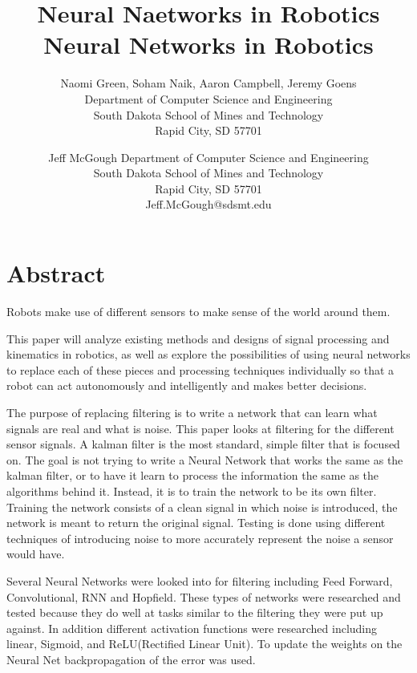 \documentclass[12pt]{article}
\begin{document}
\pagestyle{plain}

\title{Neural Naetworks in Robotics}

\author{
Naomi Green, Soham Naik, Aaron Campbell, Jeremy Goens\\
Department of Computer Science and Engineering\\
South Dakota School of Mines and Technology\\
Rapid City, SD 57701\\
\and
Jeff McGough
Department of Computer Science and Engineering\\
South Dakota School of Mines and Technology\\
Rapid City, SD 57701\\
Jeff.McGough@sdsmt.edu
}

\title{ Neural Networks in Robotics}
\maketitle
\thispagestyle{empty}

\section*{\centering Abstract}
Robots make use of different sensors to make sense of the world around them. 

This paper will analyze existing methods and designs of signal processing and kinematics in robotics, as well as explore the possibilities of using neural networks to replace each of these pieces and processing techniques individually so that a robot can act autonomously and intelligently and makes better decisions. 

The purpose of replacing filtering is to write a network that can learn what signals are real and what is noise. This paper looks at filtering for the different sensor signals. A kalman filter is the most standard, simple filter that is focused on. The goal is not trying to write a Neural Network that works the same as the kalman filter, or to have it learn to process the information the same as the algorithms behind it. Instead, it is to train the network to be its own filter. Training the network consists of a clean signal in which noise is introduced, the network is meant to return the original signal. Testing is done using different techniques of introducing noise to more accurately represent the noise a sensor would have.

Several Neural Networks were looked into for filtering including Feed Forward, Convolutional, RNN and Hopfield. These types of networks were researched and tested because they do well at tasks similar to the filtering they were put up against. In addition different activation functions were researched including linear, Sigmoid, and ReLU(Rectified Linear Unit). To update the weights on the Neural Net backpropagation of the error was used.
\end{document}
